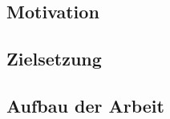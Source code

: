 \lipsum[5]

\subsection{Motivation}\label{subsec:motivation}
\lipsum[5]

\subsection{Zielsetzung}\label{subsec:zielsetzung}
\lipsum[5]

\subsection{Aufbau der Arbeit}\label{subsec:aufbau-der-arbeit}
\lipsum[5]
